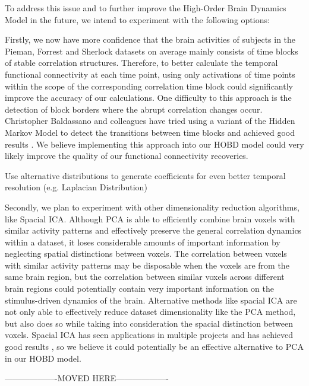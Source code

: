 \documentclass[11pt]{article}
\begin{document}
To address this issue and to further improve the High-Order Brain Dynamics Model in the future, we intend to experiment with the following options:

Firstly, we now have more confidence that the brain activities of subjects in the Pieman, Forrest and Sherlock datasets on average mainly consists of time blocks of stable correlation structures. Therefore, to better calculate the temporal functional connectivity at each time point, using only activations of time points within the scope of the corresponding correlation time block could significantly improve the accuracy of our calculations. One difficulty to this approach is the detection of block borders where the abrupt correlation changes occur. Christopher Baldassano and colleagues have tried using a variant of the Hidden Markov Model to detect the transitions between time blocks and achieved good results \citep{Baldassano2016}. We believe implementing this approach into our HOBD model could very likely improve the quality of our functional connectivity recoveries.

Use alternative distributions to generate coefficients for even better temporal resolution (e.g. Laplacian Distribution)

Secondly, we plan to experiment with other dimensionality reduction algorithms, like Spacial ICA. Although PCA is able to efficiently combine brain voxels with similar activity patterns and effectively preserve the general correlation dynamics within a dataset, it loses considerable amounts of important information by neglecting spatial distinctions between voxels. The correlation between voxels with similar activity patterns may be disposable when the voxels are from the same brain region, but the correlation between similar voxels across different brain regions could potentially contain very important information on the stimulus-driven dynamics of the brain. Alternative methods like spacial ICA are not only able to effectively reduce dataset dimensionality like the PCA method, but also does so while taking into consideration the spacial distinction between voxels. Spacial ICA has seen applications in multiple projects and has achieved good results \citep{Dipasquale2015,Iraji2016,Xu2013}, so we believe it could potentially be an effective alternative to PCA in our HOBD model.

-------------------MOVED HERE-------------------
\end{document}
